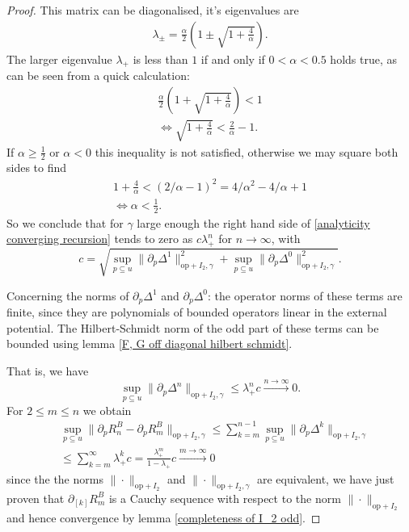\documentclass[b5paper,draft,openbib,12pt]{memoir}
\begin{document}
\begin{proof}
This matrix can be diagonalised, it's eigenvalues are
\begin{align}
\lambda_{\pm}= \frac{\alpha}{2}\left(1\pm \sqrt{1+\frac{4}{\alpha}}\right).
\end{align}
The larger eigenvalue \(\lambda_+\) is less than \(1\) if
and only if
\(0<\alpha<0.5\) holds true, as can be seen from a quick 
calculation:
\begin{align}
\frac{\alpha}{2}\left(1+\sqrt{1+\frac{4}{\alpha}}\right)<1 \\
\iff \sqrt{1+\frac{4}{\alpha}}<\frac{2}{\alpha}-1.
\end{align}
If \(\alpha\ge \frac{1}{2}\) or \(\alpha<0\) this inequality is not satisfied, otherwise
we may square both sides to find
\begin{align}
1+\frac{4}{\alpha}<(2/\alpha -1)^2=4/\alpha^2 - 4/\alpha +1\\
\iff \alpha < \frac{1}{2}.
\end{align}
So we conclude that for \(\gamma\) large enough 
the right hand 
side of \eqref{analyticity converging recursion}
tends to zero as \(c \lambda_+^n\) for
\(n\rightarrow \infty\), with
\begin{equation}
c=\sqrt{\sup_{p\subseteq u} \|\partial_p \Delta^1\|^2_{\mathrm{op}+I_2,\gamma}
+\sup_{p\subseteq u} \|\partial_p \Delta^0\|^2_{\mathrm{op}+I_2,\gamma}}.
\end{equation}


Concerning the norms of \(\partial_p \Delta^1\)
and \(\partial_p \Delta^0\): the operator norms 
of these terms are finite, since they are polynomials 
of bounded operators linear in the external potential.
The Hilbert-Schmidt norm of the odd part of these 
terms can be bounded using lemma 
\ref{F, G off diagonal hilbert schmidt}.

That is, we have  
\begin{equation}
\sup_{p\subseteq u}
\|\partial_p \Delta^n\|_{\mathrm{op}+I_2,\gamma}
\le \lambda_+^n c
\xrightarrow{n\rightarrow \infty} 0.
\end{equation}
For \(2\le m\le n\) we obtain  
\begin{align}
&\sup_{p\subseteq u}\| \partial_p R^B_n -
\partial_p R^B_m\|_{\mathrm{op}+I_2,\gamma} 
\le 
\sum_{k=m}^{n-1}
\sup_{p\subseteq u}
\| \partial_p \Delta^k\|_{\mathrm{op}+I_2,\gamma} \\
&\le \sum_{k=m}^{\infty}
\lambda_+^k c
= \frac{\lambda_+^m }{1-\lambda_+} c
\xrightarrow{m\rightarrow \infty}0
\end{align}
since the the norms
\(\|\cdot\|_{\mathrm{op}+I_2}\) and
\(\|\cdot\|_{\mathrm{op}+I_2,\gamma}\) are 
equivalent, we have just proven 
that \(\partial_{[k]} R^B_m\) is a 
Cauchy sequence with respect to the norm 
\(\|\cdot\|_{\mathrm{op}+I_2}\) and 
hence convergence by 
lemma \ref{completeness of I_2 odd}.


\end{proof}
\end{document}
